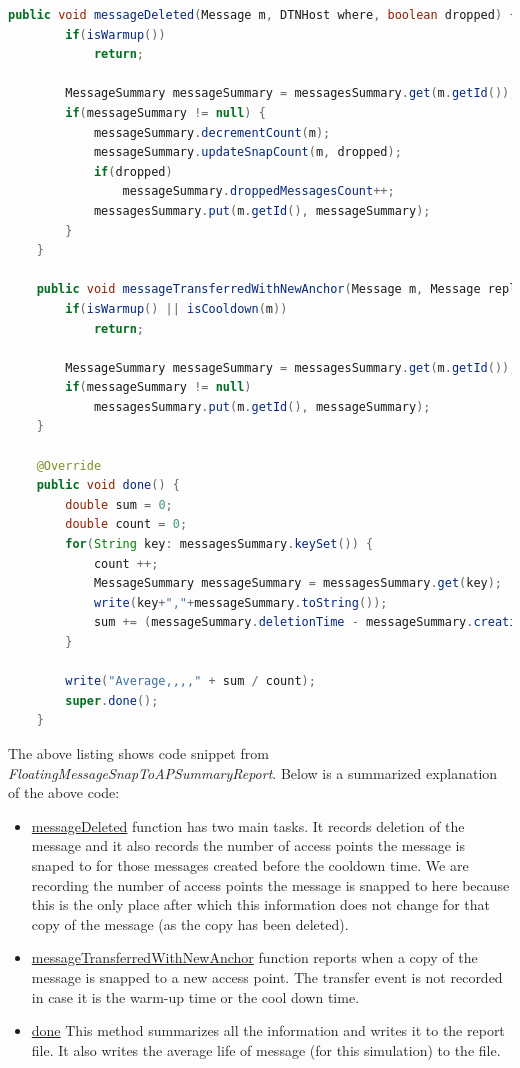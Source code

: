 \begin{lstlisting}[language=java]
	public void messageDeleted(Message m, DTNHost where, boolean dropped) {
		if(isWarmup())
			return;

		MessageSummary messageSummary = messagesSummary.get(m.getId());
		if(messageSummary != null) {
			messageSummary.decrementCount(m);
			messageSummary.updateSnapCount(m, dropped);
			if(dropped)
				messageSummary.droppedMessagesCount++;
			messagesSummary.put(m.getId(), messageSummary);
		}
	}

	public void messageTransferredWithNewAnchor(Message m, Message replicatedWithNewAnchor, DTNHost from, DTNHost to) {
		if(isWarmup() || isCooldown(m))
			return;

		MessageSummary messageSummary = messagesSummary.get(m.getId());
		if(messageSummary != null)
			messagesSummary.put(m.getId(), messageSummary);
	}

	@Override
	public void done() {
	    double sum = 0;
	    double count = 0;
	    for(String key: messagesSummary.keySet()) {
	    	count ++;
	    	MessageSummary messageSummary = messagesSummary.get(key);
	    	write(key+","+messageSummary.toString());
	    	sum += (messageSummary.deletionTime - messageSummary.creationTime) / 60.0;
	    }

	    write("Average,,,," + sum / count);
	    super.done();
	}
\end{lstlisting}
\vspace{5mm}
The above listing shows code snippet from \textit{FloatingMessageSnapToAPSummaryReport}. Below is a summarized explanation of the above code:
\begin{itemize}
	\item \underline{messageDeleted} function has two main tasks. It records deletion of the message and it also records the number of access points the message is snaped to for those messages created before the cooldown time.  We are recording the number of access points the message is snapped to here because this is the only place after which this information does not change for that copy of the message (as the copy has been deleted).
	\item \underline{messageTransferredWithNewAnchor} function reports when a copy of the message is snapped to a new access point. The transfer event is not recorded in case it is the warm-up time or the cool down time.
	\item \underline{done} This method summarizes all the information and writes it to the report file. It also writes the average life of message (for this simulation) to the file.
\end{itemize}


